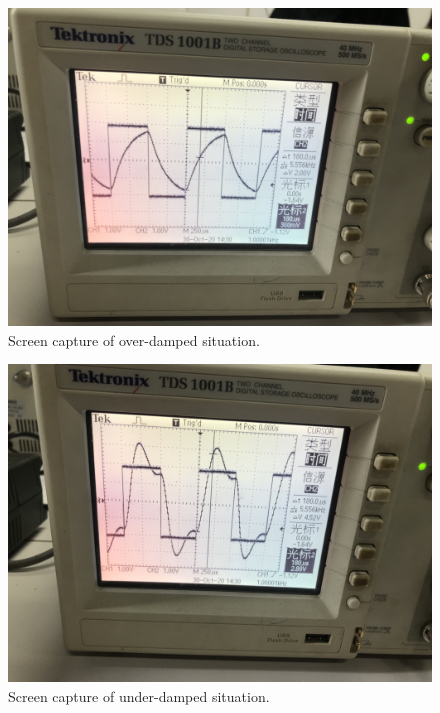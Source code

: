 \documentclass[12pt,a4paper]{article}
\begin{document}
\begin{figure}[H]
    \centering
    \includegraphics[scale=0.1]{over.jpeg}
    \caption{ Screen capture of over-damped situation.}
    \label{ Screen capture of over-damped situation.}
\end{figure}
\begin{figure}[H]
    \centering
    \includegraphics[scale=0.085]{under.jpeg}
    \caption{ Screen capture of under-damped situation.}
    \label{ Screen capture of under-damped situation.}
\end{figure}
\end{document}
